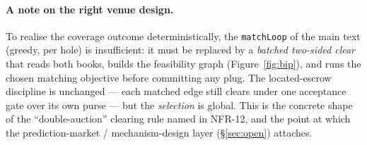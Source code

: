 \documentclass[11pt]{article}
\theoremstyle{definition}
\begin{document}
\paragraph{A note on the right venue design.} To realise the coverage outcome deterministically, the
\texttt{matchLoop} of the main text (greedy, per hole) is insufficient: it must be replaced by a
\emph{batched two-sided clear} that reads both books, builds the feasibility graph
(Figure~\ref{fig:bip}), and runs the chosen matching objective before committing any plug. The
located-escrow discipline is unchanged --- each matched edge still clears under one acceptance gate
over its own purse --- but the \emph{selection} is global. This is the concrete shape of the
``double-auction'' clearing rule named in NFR-12, and the point at which the prediction-market /
mechanism-design layer (\S\ref{sec:open}) attaches.
\end{document}
